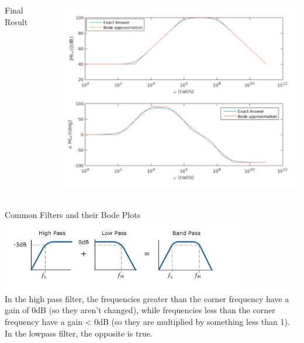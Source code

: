 \documentclass{beamer}
\begin{document}
    \begin{frame}{}
        \begin{columns}
            \begin{column}{0.25\textwidth}
                Final Result
            \end{column}
            \begin{column}{0.75\textwidth}
                \includegraphics[scale=0.75]{practice-problem.png}\\
            \end{column}
        \end{columns}
    \end{frame}
    \begin{frame}{Common Filters and their Bode Plots}
        \includegraphics[]{common-filter-bode-plot.png}\\
        In the high pass filter, the frequencies greater than the corner frequency have a gain of 0dB (so they aren’t changed), while frequencies less than the corner frequency have a gain < 0dB (so they are multiplied by something less than 1). \\
        In the lowpass filter, the opposite is true.
    \end{frame}
\end{document}
